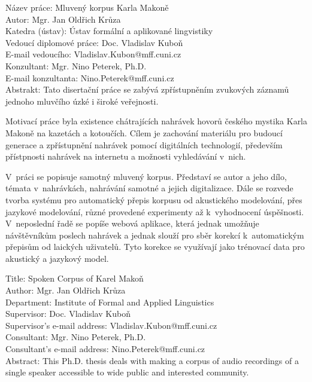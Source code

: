 \noindent Název práce: Mluven\'{y} korpus Karla Makon\v{e}\\
Autor: Mgr. Jan Oldřich Krůza\\
Katedra (ústav): Ústav formální a aplikované lingvistiky\\
Vedoucí diplomové práce: Doc. Vladislav Kuboň\\
E-mail vedoucího: Vladislav.Kubon@mff.cuni.cz\\
Konzultant: Mgr. Nino Peterek, Ph.D.\\
E-mail konzultanta: Nino.Peterek@mff.cuni.cz\\

\noindent Abstrakt: Tato disertační práce se zabývá zpřístupněním zvukových
záznamů jednoho mluvčího úzké i široké veřejnosti.

Motivací práce byla existence chátrajících nahrávek hovorů českého mystika
Karla Makoně na kazetách a kotoučích. Cílem je zachování materiálu pro
budoucí generace a zpřístupnění nahrávek pomocí digitálních technologií,
především přístpnosti nahrávek na internetu a možnosti vyhledávání v~nich.

V~práci se popisuje samotný mluvený korpus. Představí se autor a
jeho dílo,
témata v~nahrávkách, nahrávání samotné a jejich digitalizace. Dále se rozvede tvorba systému pro automatický
přepis korpusu od akustického modelování, přes jazykové modelování, různé
provedené experimenty až k~vyhodnocení úspěšnosti. V~neposlední řadě se popíše
webová aplikace, která jednak umožňuje návštěvníkům
poslech nahrávek a jednak slouží pro sběr korekcí k~automatickým přepisům od
laických uživatelů. Tyto korekce se využívají jako trénovací
data pro akustický a jazykový model.

\vspace{10mm}

\noindent
Title: Spoken Corpus of Karel Makoň\\
Author: Mgr. Jan Oldřich Krůza\\
Department: Institute of Formal and Applied Linguistics\\
Supervisor: Doc. Vladislav Kuboň\\
Supervisor's e-mail address: Vladislav.Kubon@mff.cuni.cz\\
Consultant: Mgr. Nino Peterek, Ph.D.\\
Consultant's e-mail address: Nino.Peterek@mff.cuni.cz\\

\noindent Abstract:  This Ph.D. thesis deals with making a corpus of audio
recordings of a single speaker accessible to wide public and interested community.

